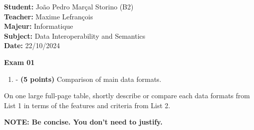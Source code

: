 \documentclass[a4paper,10pt]{article}
\begin{document}
\begin{flushleft}
    \textbf{Student:} João Pedro Marçal Storino (B2) \\
    \textbf{Teacher:} Maxime Lefrançois \\
    \textbf{Majeur:} Informatique \\
    \textbf{Subject:} Data Interoperability and Semantics \\
    \textbf{Date:} 22/10/2024 \\
\end{flushleft}

\vspace{0cm}
\begin{center}
    {\LARGE \textbf{Exam 01}}
\end{center}
\vspace{-.5cm}

\begin{enumerate}[label=\textbf{Part \arabic*}]
    \item - \textbf{(5 points)} Comparison of main data formats.
\end{enumerate}

On one large full-page table, shortly describe or compare each data formats from List 1 in terms of the features and
criteria from List 2.

\textbf{NOTE: Be concise. You don’t need to justify.}
\end{document}
